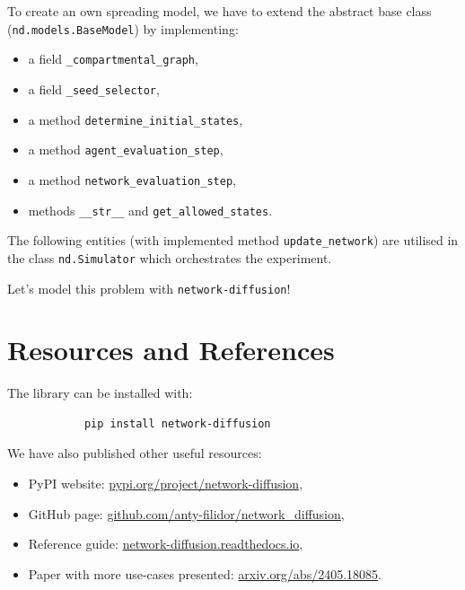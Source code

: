 \documentclass{beamer}
\begin{document}
\begin{frame}{\secname}
    To create an own spreading model, we have to extend the abstract base class
    (\lstinline[style=py]{nd.models.BaseModel}) by implementing:
    \begin{itemize}
        \item a field \lstinline[style=py]{_compartmental_graph},
        \item a field \lstinline[style=py]{_seed_selector},
        \item a method \lstinline[style=py]{determine_initial_states},
        \item a method \lstinline[style=py]{agent_evaluation_step},
        \item a method \lstinline[style=py]{network_evaluation_step},
        \item methods \lstinline[style=py]{__str__} and \lstinline[style=py]{get_allowed_states}.
    \end{itemize}
    \vspace{1em}
    The following entities (with implemented method \lstinline[style=py]{update_network}) are
    utilised in the class \lstinline[style=py]{nd.Simulator} which orchestrates the experiment.
\end{frame}

\begin{frame}{\secname}
    \begin{center}
        \large Let's model this problem with \lstinline[style=py]{network-diffusion}!
    \end{center}
\end{frame}

\section{Resources and References}

\begin{frame}[fragile]{\secname}
    The library can be installed with:
    \begin{center}
        \large
        \begin{verbatim}
            pip install network-diffusion
        \end{verbatim}
    \end{center}
    We have also published other useful resources:
    \begin{itemize}
        \item PyPI website: \url{pypi.org/project/network-diffusion},
        \item GitHub page: \url{github.com/anty-filidor/network_diffusion},
        \item Reference guide: \url{network-diffusion.readthedocs.io},
        \item Paper with more use-cases presented: \url{arxiv.org/abs/2405.18085}.
    \end{itemize}
\end{frame}
\end{document}
